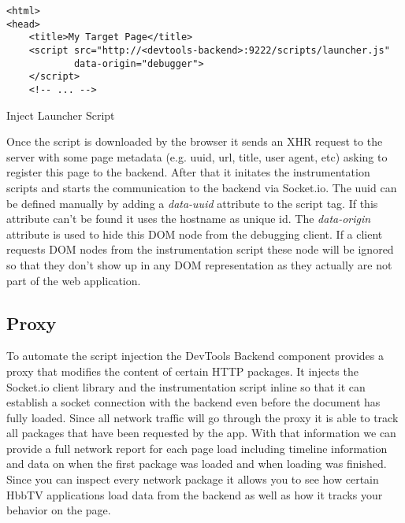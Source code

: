 \vspace{0.3cm}
\begin{listing}[H]
\begin{verbatim}
<html>
<head>
    <title>My Target Page</title>
    <script src="http://<devtools-backend>:9222/scripts/launcher.js"
            data-origin="debugger">
    </script>
    <!-- ... -->
\end{verbatim}
\caption{Inject Launcher Script}
\label{lst:launcher}
\end{listing}

Once the script is downloaded by the browser it sends an XHR request to the server with some page metadata
(e.g. uuid, url, title, user agent, etc) asking to register this page to the backend. After that it
initates the instrumentation scripts and starts the communication to the backend via Socket.io. The uuid
can be defined manually by adding a \textit{data-uuid} attribute to the script tag. If this attribute
can't be found it uses the hostname as unique id. The \textit{data-origin} attribute is used to hide this
DOM node from the debugging client. If a client requests DOM nodes from the instrumentation script these
node will be ignored so that they don't show up in any DOM representation as they actually are not part
of the web application.

\subsection{Proxy\label{sec:proxy}}

To automate the script injection the DevTools Backend component provides a proxy that modifies the content
of certain HTTP packages. It injects the Socket.io client library and the instrumentation script inline so
that it can establish a socket connection with the backend even before the document has fully loaded.
Since all network traffic will go through the proxy it is able to track all packages that have been
requested by the app. With that information we can provide a full network report for each page load
including timeline information and data on when the first package was loaded and when loading was finished.
Since you can inspect every network package it allows you to see how certain HbbTV applications load data
from the backend as well as how it tracks your behavior on the page.

